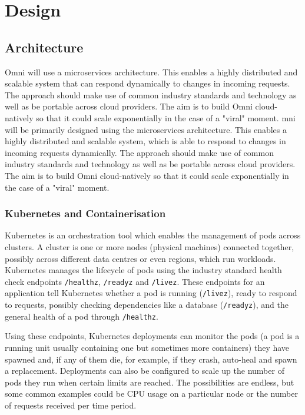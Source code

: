 \chapter{Design}
\label{cha:design}

\section{Architecture}
\label{sec:design-architecture}
Omni will use a microservices architecture. This enables a highly distributed and scalable system that can respond dynamically to changes in incoming requests.
The approach should make use of common industry standards and technology as well as be portable across cloud providers. The aim is to build Omni cloud-natively so that it could scale exponentially in the case of a "viral" moment.
mni will be primarily designed using the microservices architecture. This enables a highly distributed and scalable system, which is able to respond to changes in incoming requests dynamically. 
The approach should make use of common industry standards and technology as well as be portable across cloud providers. The aim is to build Omni cloud-natively so that it could scale exponentially in the case of a "viral" moment.

\subsection{Kubernetes and Containerisation}
\label{sec:design-system-kubernetes}
Kubernetes is an orchestration tool which enables the management of pods across clusters. A cluster is one or more nodes (physical machines) connected together, possibly across different data centres or even regions, which run workloads.
Kubernetes manages the lifecycle of pods using the industry standard health check endpoints \texttt{/healthz}, \texttt{/readyz} and \texttt{/livez}. These endpoints for an application tell Kubernetes whether a pod is running (\texttt{/livez}), ready to respond to requests, possibly checking dependencies like a database (\texttt{/readyz}), and the general health of a pod through \texttt{/healthz}.

Using these endpoints, Kubernetes deployments can monitor the pods (a pod is a running unit usually containing one but sometimes more containers) they have spawned and, if any of them die, for example, if they crash, auto-heal and spawn a replacement.
Deployments can also be configured to scale up the number of pods they run when certain limits are reached. The possibilities are endless, but some common examples could be CPU usage on a particular node or the number of requests received per time period.

